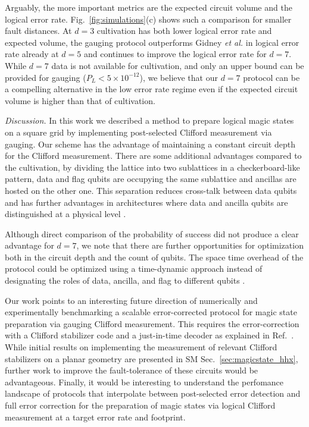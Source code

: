 \documentclass[aps,prx,twocolumn,secnumarabic,superscriptaddress,nofootinbib]{revtex4-2}
\begin{document}
Arguably, the more important metrics are the expected circuit volume and the logical error rate. Fig.~\ref{fig:simulations}(c) shows such a comparison for smaller fault distances. At $d=3$ cultivation has both lower logical error rate and expected volume, the gauging protocol outperforms Gidney {\it et al.} in logical error rate already at $d=5$ and continues to improve the logical error rate for $d=7$. While $d=7$ data is not available for cultivation, and only an upper bound can be provided for gauging ($P_L<5\times10^{-12}$), we believe that our $d=7$ protocol can be a compelling alternative in the low error rate regime even if the expected circuit volume is higher than that of cultivation.

{\it Discussion.} In this work we described a method to prepare logical magic states on a square grid by implementing post-selected Clifford measurement via gauging. 
Our scheme has the advantage of maintaining a constant circuit depth for the Clifford measurement. 
There are some additional advantages compared to the cultivation, by dividing the lattice into two sublattices in a checkerboard-like pattern, data and flag qubits are occupying the same sublattice and ancillas are hosted on the other one. This separation reduces cross-talk between data qubits and has further advantages in architectures where data and ancilla qubits are distinguished at a physical level \cite{lacroixScalingLogicColor2024}. 


Although direct comparison of the probability of success did not produce a clear advantage for $d=7$, we note that there are further opportunities for optimization both in the circuit depth and the count of qubits. The space time overhead of the protocol could be optimized using a time-dynamic approach instead of designating the roles of data, ancilla, and flag to different qubits \cite{mcewenRelaxingHardwareRequirements2023,shawLoweringConnectivityRequirements2025a}.

Our work points to an interesting future direction of numerically and experimentally benchmarking a scalable error-corrected protocol for magic state preparation via gauging Clifford measurement. This requires the error-correction with a Clifford stabilizer code and a just-in-time decoder as explained in Ref.~\cite{davydovaUniversalFaultTolerant}. While initial results on implementing the measurement of relevant Clifford stabilizers on a planar geometry are presented in SM Sec.~\ref{sec:magicstate_hhx}, further work to improve the fault-tolerance of these circuits would be advantageous. Finally, it would be interesting to understand the perfomance landscape of protocols that interpolate between post-selected error detection and full error correction for the preparation of magic states via logical Clifford measurement at a target error rate and footprint. 
\end{document}
